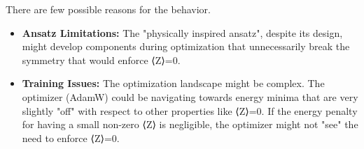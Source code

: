 \documentclass[pre,twocolumn,floatfix]{revtex4-1}
\begin{document}
There are few possible reasons for the behavior.
\begin{itemize}
    \item \textbf{Ansatz Limitations:} The "physically inspired ansatz", despite its design, might develop components during optimization that unnecessarily break the symmetry that would enforce ⟨Z⟩=0.
    \item \textbf{Training Issues:} The optimization landscape might be complex. The optimizer (AdamW) could be navigating towards energy minima that are very slightly "off" with respect to other properties like ⟨Z⟩=0. If the energy penalty for having a small non-zero ⟨Z⟩ is negligible, the optimizer might not "see" the need to enforce ⟨Z⟩=0.
\end{itemize}
\end{document}
